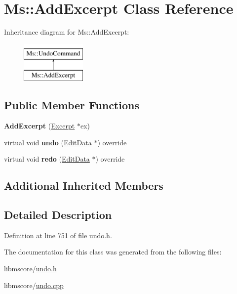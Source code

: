 \hypertarget{class_ms_1_1_add_excerpt}{}\section{Ms\+:\+:Add\+Excerpt Class Reference}
\label{class_ms_1_1_add_excerpt}
Inheritance diagram for Ms\+:\+:Add\+Excerpt\+:\begin{figure}[H]
\begin{center}
\leavevmode
\includegraphics[height=2.000000cm]{class_ms_1_1_add_excerpt}
\end{center}
\end{figure}
\subsection*{Public Member Functions}
\begin{DoxyCompactItemize}
\item 
\mbox{\label{class_ms_1_1_add_excerpt_a39d4f9f72aeb4b1ec40fca011d106119}} 
{\bfseries Add\+Excerpt} (\hyperlink{class_ms_1_1_excerpt}{Excerpt} $\ast$ex)
\item 
\mbox{\label{class_ms_1_1_add_excerpt_a7c7d3a057f5542d33872d9c54a9350b5}} 
virtual void {\bfseries undo} (\hyperlink{class_ms_1_1_edit_data}{Edit\+Data} $\ast$) override
\item 
\mbox{\label{class_ms_1_1_add_excerpt_a837ba02525776afd0115e58f2c84c17b}} 
virtual void {\bfseries redo} (\hyperlink{class_ms_1_1_edit_data}{Edit\+Data} $\ast$) override
\end{DoxyCompactItemize}
\subsection*{Additional Inherited Members}


\subsection{Detailed Description}


Definition at line 751 of file undo.\+h.



The documentation for this class was generated from the following files\+:\begin{DoxyCompactItemize}
\item 
libmscore/\hyperlink{undo_8h}{undo.\+h}\item 
libmscore/\hyperlink{undo_8cpp}{undo.\+cpp}\end{DoxyCompactItemize}
